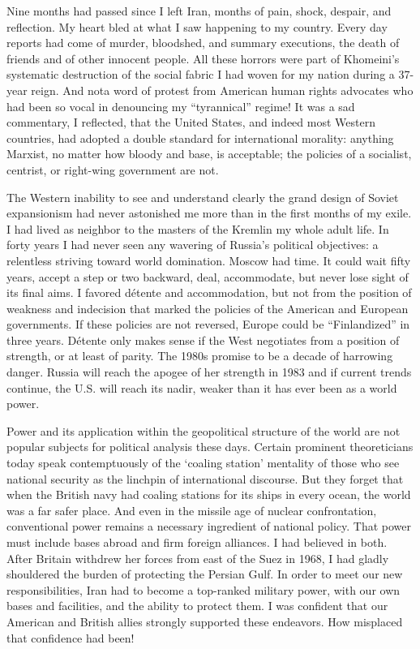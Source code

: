 Nine months had passed since I left Iran, months of pain, shock, despair, and reflection. My heart bled at what I saw happening to my country. Every day reports had come of murder, bloodshed, and summary executions, the death of friends and of other innocent people. All these horrors were part of Khomeini’s systematic destruction of the social fabric I had woven for my nation during a 37-year reign. And nota word of protest from American human rights advocates who had been so vocal in denouncing my “tyrannical” regime! It was a sad commentary, I reflected, that the United States, and indeed most Western countries, had adopted a double standard for international morality: anything Marxist, no matter how bloody and base, is acceptable; the policies of a socialist, centrist, or right-wing government are not. 

The Western inability to see and understand clearly the grand design of Soviet expansionism had never astonished me more than in the first months of my exile. I had lived as neighbor to the masters of the Kremlin my whole adult life. In forty years I had never seen any wavering of Russia's political objectives: a relentless striving toward world domination. Moscow had time. It could wait fifty years, accept a step or two backward, deal, accommodate, but never lose sight of its final aims. I favored détente and accommodation, but not from the position of weakness and indecision that marked the policies of the American and European governments. If these policies are not reversed, Europe could be “Finlandized” in three years. Détente only makes sense if the West negotiates from a position of strength, or at least of parity. The 1980s promise to be a decade of harrowing danger. Russia will reach the apogee of her strength in 1983 and if current trends continue, the U.S. will reach its nadir, weaker than it has ever been as a world power. 

Power and its application within the geopolitical structure of the world are not popular subjects for political analysis these days. Certain prominent theoreticians today speak contemptuously of the ‘coaling station’ mentality of those who see national security as the linchpin of international discourse. But they forget that when the British navy had coaling stations for its ships in every ocean, the world was a far safer place. And even in the missile age of nuclear confrontation, conventional power remains a necessary ingredient of national policy. That power must include bases abroad and firm foreign alliances. I had believed in both. After Britain withdrew her forces from east of the Suez in 1968, I had gladly shouldered the burden of protecting the Persian Gulf. In order to meet our new responsibilities, Iran had to become a top-ranked military power, with our own bases and facilities, and the ability to protect them. I was confident that our American and British allies strongly supported these endeavors. How misplaced that confidence had been! 

